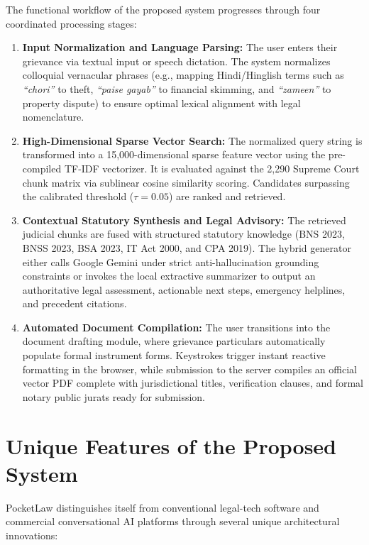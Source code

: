 The functional workflow of the proposed system progresses through four coordinated processing stages:
\begin{enumerate}
    \item \textbf{Input Normalization and Language Parsing:} The user enters their grievance via textual input or speech dictation. The system normalizes colloquial vernacular phrases (e.g., mapping Hindi/Hinglish terms such as \textit{``chori''} to theft, \textit{``paise gayab''} to financial skimming, and \textit{``zameen''} to property dispute) to ensure optimal lexical alignment with legal nomenclature.
    \item \textbf{High-Dimensional Sparse Vector Search:} The normalized query string is transformed into a 15,000-dimensional sparse feature vector using the pre-compiled TF-IDF vectorizer. It is evaluated against the 2,290 Supreme Court chunk matrix via sublinear cosine similarity scoring. Candidates surpassing the calibrated threshold ($\tau = 0.05$) are ranked and retrieved.
    \item \textbf{Contextual Statutory Synthesis and Legal Advisory:} The retrieved judicial chunks are fused with structured statutory knowledge (BNS 2023, BNSS 2023, BSA 2023, IT Act 2000, and CPA 2019). The hybrid generator either calls Google Gemini under strict anti-hallucination grounding constraints or invokes the local extractive summarizer to output an authoritative legal assessment, actionable next steps, emergency helplines, and precedent citations.
    \item \textbf{Automated Document Compilation:} The user transitions into the document drafting module, where grievance particulars automatically populate formal instrument forms. Keystrokes trigger instant reactive formatting in the browser, while submission to the server compiles an official vector PDF complete with jurisdictional titles, verification clauses, and formal notary public jurats ready for submission.
\end{enumerate}

\section{Unique Features of the Proposed System}
\label{sec:unique_features}

PocketLaw distinguishes itself from conventional legal-tech software and commercial conversational AI platforms through several unique architectural innovations:

